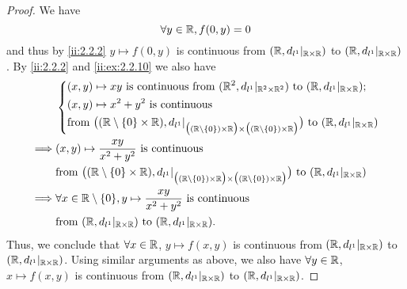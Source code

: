 \begin{proof}
  We have
  \[
    \forall y \in \mathbb{R}, f(0, y) = 0
  \]
  and thus by \cref{ii:2.2.2} \(y \mapsto f(0, y)\) is continuous from \((\mathbb{R}, d_{l^1}|_{\mathbb{R} \times \mathbb{R}})\) to \((\mathbb{R}, d_{l^1}|_{\mathbb{R} \times \mathbb{R}})\).
  By \cref{ii:2.2.2} and \cref{ii:ex:2.2.10} we also have
  \begin{align*}
             & \begin{dcases}
                 (x, y) \mapsto x y \text{ is continuous from } (\R^2, d_{l^1}|_{\R^2 \times \R^2}) \text{ to } (\R, d_{l^1}|_{\R \times \R}); \\
                 (x, y) \mapsto x^2 + y^2 \text{ is continuous}                                                                                \\
                 \text{from } \big((\R \setminus \set{0} \times \R), d_{l^1}|_{\big((\R \setminus \set{0}) \times \R\big) \times \big((\R \setminus \set{0}) \times \R\big)}\big) \text{ to } (\R, d_{l^1}|_{\R \times \R})
               \end{dcases}  \\
    \implies & (x, y) \mapsto \dfrac{xy}{x^2 + y^2} \text{ is continuous}                                                                                                                                                 \\
             & \text{from } \big((\R \setminus \set{0} \times \R), d_{l^1}|_{\big((\R \setminus \set{0}) \times \R\big) \times \big((\R \setminus \set{0}) \times \R\big)}\big) \text{ to } (\R, d_{l^1}|_{\R \times \R}) \\
    \implies & \forall x \in \R \setminus \set{0}, y \mapsto \dfrac{xy}{x^2 + y^2} \text{ is continuous}                                                                                                                  \\
             & \text{from } (\R, d_{l^1}|_{\R \times \R}) \text{ to } (\R, d_{l^1}|_{\R \times \R}).
  \end{align*}
  Thus, we conclude that \(\forall x \in \mathbb{R}\), \(y \mapsto f(x, y)\) is continuous from \((\mathbb{R}, d_{l^1}|_{\mathbb{R} \times \mathbb{R}})\) to \((\mathbb{R}, d_{l^1}|_{\mathbb{R} \times \mathbb{R}})\).
  Using similar arguments as above, we also have \(\forall y \in \mathbb{R}\), \(x \mapsto f(x, y)\) is continuous from \((\mathbb{R}, d_{l^1}|_{\mathbb{R} \times \mathbb{R}})\) to \((\mathbb{R}, d_{l^1}|_{\mathbb{R} \times \mathbb{R}})\).


\end{proof}
